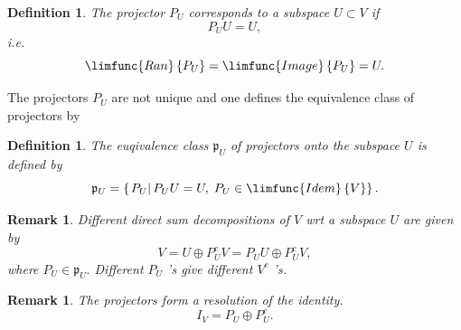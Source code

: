 \documentclass[aps,preprint]{revtex4}
\newtheorem{definition}[theorem]{Definition}
\newtheorem{remark}[theorem]{Remark}
\begin{document}
\begin{definition}
The projector $P_{U}$ corresponds to a subspace $U\subset V$ if 
\begin{equation}
P_{U}U=U,
\end{equation}%
i.e. 
\begin{equation}
\limfunc{Ran}\left\{ P_{U}\right\} =\limfunc{Image}\left\{ P_{U}\right\} =U.
\end{equation}
\end{definition}

The projectors $P_{U}$ are not unique and one defines the equivalence class
of projectors by

\begin{definition}
The euqivalence class $\mathfrak{p}_{U}$ of projectors onto the subspace $U$
is defined by 
\begin{equation}
\mathfrak{p}_{U}=\left\{ \left. P_{U}\right\vert P_{U}U=U,\;P_{U}\in 
\limfunc{Idem}\left\{ V\right\} \right\} .
\end{equation}
\end{definition}

\begin{remark}
Different direct sum decompositions of $V$ wrt a subspace $U$ are given by 
\begin{equation}
V=U\oplus P_{U}^{c}V=P_{U}U\oplus P_{U}^{c}V,
\end{equation}%
where $P_{U}\in \mathfrak{p}_{U}.$ Different $P_{U}$ 's give different $%
V^{c} $ 's.
\end{remark}

\begin{remark}
The projectors form a resolution of the identity. 
\begin{equation}
I_{V}=P_{U}\oplus P_{U}^{c}.
\end{equation}
\end{remark}
\end{document}
